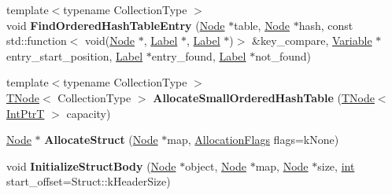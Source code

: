 \begin{DoxyCompactItemize}
\item 
\mbox{\label{classv8_1_1internal_1_1CodeStubAssembler_a8ae49b9ac6443ad9da064a2d409117e6}} 
{\footnotesize template$<$typename Collection\+Type $>$ }\\void {\bfseries Find\+Ordered\+Hash\+Table\+Entry} (\mbox{\hyperlink{classv8_1_1internal_1_1compiler_1_1Node}{Node}} $\ast$table, \mbox{\hyperlink{classv8_1_1internal_1_1compiler_1_1Node}{Node}} $\ast$hash, const std\+::function$<$ void(\mbox{\hyperlink{classv8_1_1internal_1_1compiler_1_1Node}{Node}} $\ast$, \mbox{\hyperlink{classv8_1_1internal_1_1compiler_1_1CodeAssemblerLabel}{Label}} $\ast$, \mbox{\hyperlink{classv8_1_1internal_1_1compiler_1_1CodeAssemblerLabel}{Label}} $\ast$)$>$ \&key\+\_\+compare, \mbox{\hyperlink{classv8_1_1internal_1_1compiler_1_1CodeAssemblerVariable}{Variable}} $\ast$entry\+\_\+start\+\_\+position, \mbox{\hyperlink{classv8_1_1internal_1_1compiler_1_1CodeAssemblerLabel}{Label}} $\ast$entry\+\_\+found, \mbox{\hyperlink{classv8_1_1internal_1_1compiler_1_1CodeAssemblerLabel}{Label}} $\ast$not\+\_\+found)
\item 
\mbox{\label{classv8_1_1internal_1_1CodeStubAssembler_a074f9814a838213b3ec50f151d3b4d76}} 
{\footnotesize template$<$typename Collection\+Type $>$ }\\\mbox{\hyperlink{classv8_1_1internal_1_1compiler_1_1TNode}{T\+Node}}$<$ Collection\+Type $>$ {\bfseries Allocate\+Small\+Ordered\+Hash\+Table} (\mbox{\hyperlink{classv8_1_1internal_1_1compiler_1_1TNode}{T\+Node}}$<$ \mbox{\hyperlink{structv8_1_1internal_1_1IntPtrT}{Int\+PtrT}} $>$ capacity)
\item 
\mbox{\label{classv8_1_1internal_1_1CodeStubAssembler_ad0e0e8dc0b5a40ae844e9bab9e345ff0}} 
\mbox{\hyperlink{classv8_1_1internal_1_1compiler_1_1Node}{Node}} $\ast$ {\bfseries Allocate\+Struct} (\mbox{\hyperlink{classv8_1_1internal_1_1compiler_1_1Node}{Node}} $\ast$map, \mbox{\hyperlink{classv8_1_1base_1_1Flags}{Allocation\+Flags}} flags=k\+None)
\item 
\mbox{\label{classv8_1_1internal_1_1CodeStubAssembler_a464b77d887f8acfaa9064d15e1b55a48}} 
void {\bfseries Initialize\+Struct\+Body} (\mbox{\hyperlink{classv8_1_1internal_1_1compiler_1_1Node}{Node}} $\ast$object, \mbox{\hyperlink{classv8_1_1internal_1_1compiler_1_1Node}{Node}} $\ast$map, \mbox{\hyperlink{classv8_1_1internal_1_1compiler_1_1Node}{Node}} $\ast$size, \mbox{\hyperlink{classint}{int}} start\+\_\+offset=Struct\+::k\+Header\+Size)

\end{DoxyCompactItemize}
